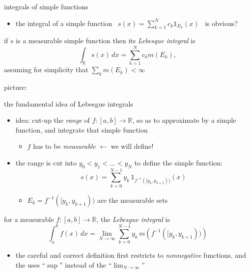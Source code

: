 \documentclass[10pt,
               svgnames,
               hyperref={colorlinks,
                         citecolor=DeepPink4,
                         linkcolor=FireBrick,
                         urlcolor=blue},
               usepdftitle=false]{beamer}
\newcommand{\RR}{\mathbb{R}}
\newcommand{\one}{\mathds{1}}
\newcommand{\ds}{\displaystyle}
\begin{document}
\begin{frame}{integrals of simple functions}

\begin{itemize}
\item the integral of a simple function \, $\ds s(x) = \sum_{k=1}^N c_k \one_{E_k}(x)$ \, is obvious?
\end{itemize}

\begin{definition}
if $s$ is a measurable simple function then its \emph{Lebesque integral} is
	$$\int_\RR s(x)\,dx = \sum_{k=1}^N c_k m(E_k),$$
assuming for simplicity that $\sum_k m(E_k)<\infty$
\end{definition}

\noindent picture:

\vspace{35mm}
\end{frame}


\begin{frame}{the fundamental idea of Lebesgue integrals}

\begin{itemize}
\item idea: \alert{cut-up the \emph{range}} of $f:[a,b] \to \RR$, so as to approximate by a simple function, and integrate that simple function
   \begin{itemize}
   \item[$\circ$] $f$ has to be \emph{measurable} \hfill \alert{$\longleftarrow$ we will define!}
   \end{itemize}
\item the range is cut into $y_0<y_1<\dots<y_N$ to define the simple function:
	$$s(x) = \sum_{k=0}^{N-1} y_{k}\, \one_{f^{-1}([y_{k},y_{k+1}))}(x)$$

   \begin{itemize}
   \item[$\circ$] $E_k = f^{-1}([y_{k},y_{k+1}))$ are the measurable sets
   \end{itemize}
\end{itemize}

\begin{definition}
for a measurable $f:[a,b] \to \RR$, the \emph{Lebesgue integral} is
    $$\int_a^b f(x)\,dx = \lim_{N\to \infty} \sum_{k=0}^{N-1} y_{k}\, m\left(f^{-1}([y_{k},y_{k+1}))\right)$$
\end{definition}

\begin{itemize}
\item the careful and correct definition first restricts to \emph{nonnegative} functions, and the uses ``$\sup$'' instead of the ``$\lim_{N\to\infty}$''
\end{itemize}
\end{frame}
\end{document}
